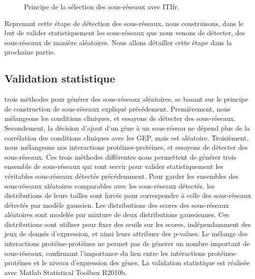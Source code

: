 			\begin{figure}
				\begin{center}
					\def\svgwidth{\columnwidth}
					\caption{Principe de la sélection des sous-réseaux avec \acl{ITIfr}.}
					\label{fig:Algorithme}
				\end{center}
			\end{figure}
			
			Reprenant cette étape de détection des sous-réseaux, nous construisons, dans le but de valider statistiquement les sous-réseaux que nous venons de détecter, des sous-réseaux de manière aléatoires.
			Nous allons détailler cette étape dans la prochaine partie.

		\subsection{\textcolor{mygreen}{Validation statistique}}
			 trois méthodes pour générer des sous-réseaux aléatoires, se basant sur le principe de construction de sous-réseaux expliqué précédement.
			Premièrement, nous mélangeons les conditions cliniques, et essayons de détecter des sous-réseaux.
			Secondement, la décision d'ajout d'un gène à un sous-réseau ne dépend plus de la corrélation des conditions cliniques avec les \acs{GEP}, mais est aléatoire.
			Troisièment, nous mélangeons nos interactions protéines-protéines, et essayons de détecter des sous-réseaux.
			Ces trois méthodes différentes nous permettent de générer trois ensemble de sous-réseaux qui vont servir pour valider statistiquement les véritables sous-réseaux détectés précédemment.
			Pour garder les ensembles des sous-réseaux aléatoires comparables avec les sous-réseaux détectés, les distributions de leurs tailles sont forcés pour correspondre à celle des sous-réseaux détectés par modèle gaussien.
			Les distributions des scores des sous-réseaux aléatoires sont modelés par mixture de deux distributions gaussiennes.
			Ces distributions sont utiliser pour fixer des seuils sur les scores, indépendamment des jeux de donnés d'expression, et ainsi leurs attribuer des p-values.
			Le mélange des interactions protéine-protéines ne permet pas de génerer un nombre important de sous-réseaux, confirmant l'importance du lien entre les intéractions protéines-protéines et le niveau d'expression des gènes.
			La validation statistique est réalisée avec Matlab Statistical Toolbox R2010b.

